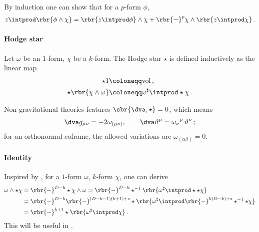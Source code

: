 \documentclass[a4paper]{article}
\begin{document}
By induction one can show that for a $p$-form $\phi$,
\begin{align}
z \intprod \rbr{\phi \wedge \chi} =
	\rbr{z\intprod\phi}\wedge \chi +
		\rbr{-}^{p} \chi \wedge \rbr{z\intprod \chi}\,.
\end{align}

\paragraph{Hodge star}

Let $\omega$ be an $1$-form, $\chi$ be a $k$-form. The Hodge star
$\star$ is defined inductively as the linear map 
\begin{align}
\star 1 &\coloneqq \mathrm{vol}\,, \\
\star\rbr{\chi\wedge\omega} &\coloneqq \omega^{\sharp} \intprod \star\chi\,.
\label{eq:hodge-100}
\end{align}

Non-gravitational theories features $\sbr{\dva, \star} = 0$, which means
\cite[sec.\ 3.2]{Muench1998}
\begin{align}
\dva g_{\mu\nu} = -2\omega_{(\mu\nu)},\qquad 
\dva\vartheta^{\mu} = \omega_{\nu}{}^{\mu}\,\vartheta^{\nu}\,;
\end{align}
for an orthonormal coframe, the allowed variations are 
$\omega_{(\alpha\beta)} = 0$.


\paragraph{Identity}

Inspired by \cite[eq.\ (3.167)]{Straumann2013}, for a $1$-form $\omega$,
$k$-form $\chi$, one can derive
\begin{align}
\omega\wedge\star\chi &= \rbr{-}^{D-k}\star\chi\wedge\omega
= \rbr{-}^{D-k} \star^{-1}
	\rbr{\omega^\sharp\intprod\star\star\chi}
\nonumber \\
&= \rbr{-}^{D-k} \rbr{-}^{(D-k-1)(k+1)+s}\star
	\rbr{\omega^\sharp\intprod \rbr{-}^{k(D-k)+s}
		\star^{-1}\star\chi }
\nonumber \\
&= \rbr{-}^{k+1} \star\rbr{\omega^\sharp\intprod \chi }\,.
\label{eq:ident-10}
\end{align}
This will be useful in .
\end{document}
